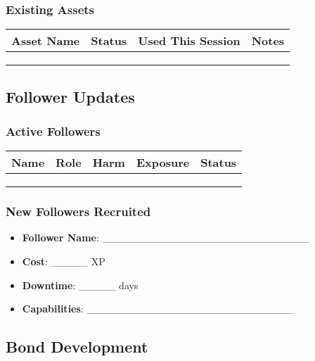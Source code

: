 \subsubsection{Existing Assets}
\begin{tabular}{|p{4cm}|p{2cm}|p{2cm}|p{2cm}|}
\hline
\textbf{Asset Name} & \textbf{Status} & \textbf{Used This Session} & \textbf{Notes} \\
\hline
& & & \\
& & & \\
& & & \\
\hline
\end{tabular}

\subsection{Follower Updates}

\subsubsection{Active Followers}
\begin{tabular}{|p{3cm}|p{2cm}|p{1.5cm}|p{1.5cm}|p{2cm}|}
\hline
\textbf{Name} & \textbf{Role} & \textbf{Harm} & \textbf{Exposure} & \textbf{Status} \\
\hline
& & & & \\
& & & & \\
& & & & \\
\hline
\end{tabular}

\subsubsection{New Followers Recruited}
\begin{itemize}
    \item \textbf{Follower Name}: \_\_\_\_\_\_\_\_\_\_\_\_\_\_\_\_\_\_\_\_\_\_\_\_\_\_\_\_
    \item \textbf{Cost}: \_\_\_\_\_ XP
    \item \textbf{Downtime}: \_\_\_\_\_ days
    \item \textbf{Capabilities}: \_\_\_\_\_\_\_\_\_\_\_\_\_\_\_\_\_\_\_\_\_\_\_\_\_\_\_\_
\end{itemize}

\subsection{Bond Development}


